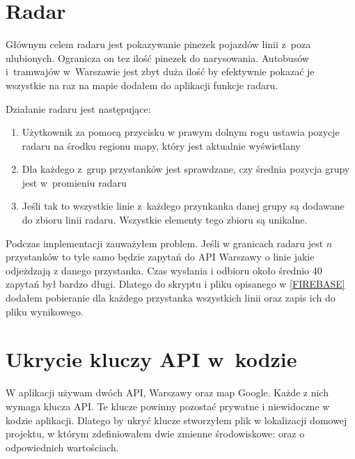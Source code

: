 \documentclass{SGGW-thesis}
\begin{document}


\label{RADAR}
\section{Radar}
Głównym celem radaru jest pokazywanie pinezek pojazdów linii z~poza ulubionych.
Ogranicza on tez ilość pinezek do narysowania.
Autobusów i~tramwajów w~Warszawie jest zbyt duża ilość by efektywnie pokazać je wszystkie na raz na mapie dodałem do aplikacji funkcje radaru.

Działanie radaru jest następujące:
\begin{enumerate}
  \item{Użytkownik za pomocą przycisku w prawym dolnym rogu ustawia pozycje radaru na środku regionu mapy, który jest aktualnie wyświetlany}
  \item{Dla każdego z~grup przystanków jest sprawdzane, czy średnia pozycja grupy jest w~promieniu radaru}
  \item{Jeśli tak to wszystkie linie z~każdego przynkanka danej grupy są dodawane do zbioru linii radaru. Wszystkie elementy tego zbioru są unikalne.}
\end{enumerate}
Podczas implementacji zauważyłem problem.
Jeśli w granicach radaru jest $n$ przystanków to tyle samo będzie zapytań do API Warszawy o linie jakie odjeżdzają z danego przystanka.
Czas wysłania i odbioru około średnio 40 zapytań był bardzo długi.
Dlatego do skryptu i pliku opisanego w \ref{FIREBASE} dodałem pobieranie dla każdego przystanka wszystkich linii oraz zapis ich do pliku wynikowego.

\section{Ukrycie kluczy API w~kodzie}
W aplikacji używam dwóch API, Warszawy oraz map Google.
Każde z nich wymaga klucza API.
Te klucze powinny pozostać prywatne i niewidoczne w kodzie aplikacji.
Dlatego by ukryć klucze stworzyłem plik  w lokalizacji domowej projektu, w którym zdefiniowałem dwie zmienne środowiskowe:
 oraz  o odpowiednich wartościach. 
\end{document}
